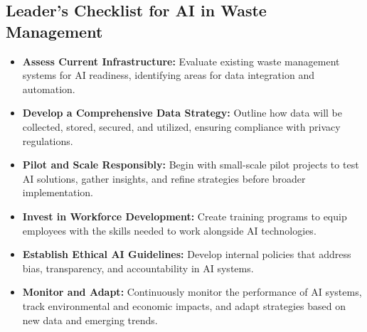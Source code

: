 \subsection{Leader's Checklist for AI in Waste Management}

\begin{itemize}
    \item \textbf{Assess Current Infrastructure:}
Evaluate existing waste management systems for AI readiness, identifying areas for data integration and automation.
    \item \textbf{Develop a Comprehensive Data Strategy:}
Outline how data will be collected, stored, secured, and utilized, ensuring compliance with privacy regulations.
    \item \textbf{Pilot and Scale Responsibly:}
Begin with small-scale pilot projects to test AI solutions, gather insights, and refine strategies before broader implementation.
    \item \textbf{Invest in Workforce Development:}
Create training programs to equip employees with the skills needed to work alongside AI technologies.
    \item \textbf{Establish Ethical AI Guidelines:}
Develop internal policies that address bias, transparency, and accountability in AI systems.
    \item \textbf{Monitor and Adapt:}
Continuously monitor the performance of AI systems, track environmental and economic impacts, and adapt strategies based on new data and emerging trends.
\end{itemize}